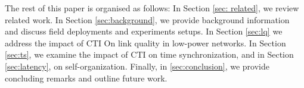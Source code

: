 The rest of this paper is organised as follows: In Section \ref{sec: related}, we review related work. In Section \ref{sec:background}, we provide background information and discuss field deployments and experiments setups. In Section \ref{sec:lq} we address the impact of CTI On link quality in low-power networks. In Section \ref{sec:ts}, we examine the impact of CTI on time synchronization, and in  Section \ref{sec:latency}, on self-organization. Finally, in \ref{sec:conclusion}, we provide concluding remarks and outline future work.

